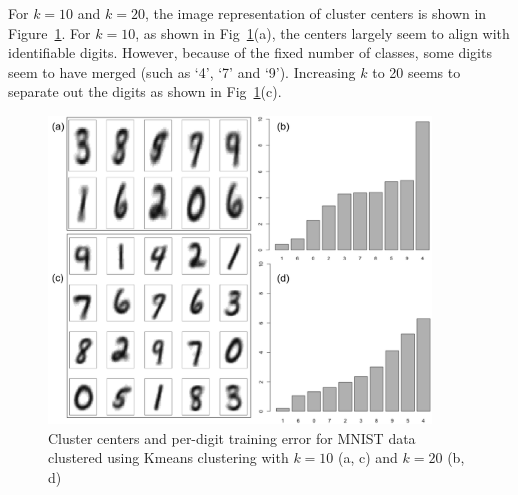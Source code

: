 \documentclass[10pt,letterpaper]{article}
\begin{document}
For $k=10$ and $k=20$, the image representation of cluster centers is shown in Figure~\ref{kmeansfull}. For $k=10$, as shown in Fig~\ref{kmeansfull}(a), the centers largely seem to align with identifiable digits. However, because of the fixed number of classes, some digits seem to have merged (such as `4', `7' and `9'). Increasing $k$ to 20 seems to separate out the digits as shown in Fig~\ref{kmeansfull}(c). 
\begin{figure}[tbp]
\begin{center}
\includegraphics[width=4in]{../plots/kmeans.png}
\caption{Cluster centers and per-digit training error for MNIST data clustered using Kmeans clustering with $k=10$ (a, c) and $k=20$ (b, d)\label{kmeansfull}}
\end{center}
\end{figure}
\end{document}
